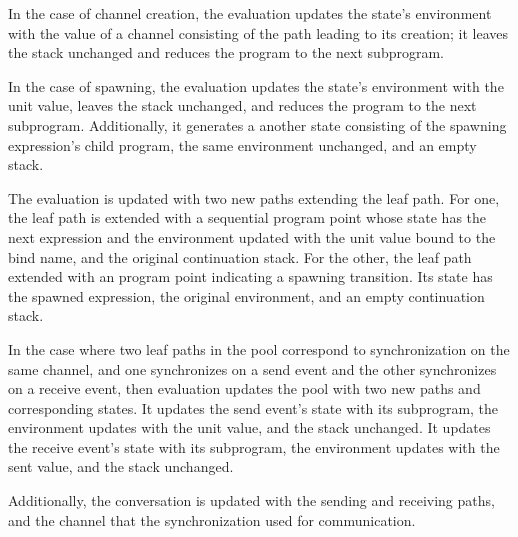 \documentclass[10pt]{article}
\begin{document}
In the case of channel creation, the evaluation updates the state's environment with the
value of a channel consisting of the path leading to its creation; it leaves the stack
unchanged and reduces the program to the next subprogram.

In the case of spawning, the evaluation updates the state's environment with the
unit value, leaves the stack unchanged, and reduces the program to the next subprogram.
Additionally, it generates a another state consisting of the spawning expression's child
program, the same environment unchanged, and an empty stack.

The evaluation is updated with two
new paths extending the leaf path.  For one, the leaf path is extended with a sequential
program point whose state has the next expression and the environment updated
with the unit value bound to
the bind name, and the original continuation stack. For the other, the leaf path
extended with an program point indicating a spawning transition.  Its state has the spawned
expression, the original environment, and an empty continuation stack. 

In the case where two leaf paths in the pool correspond to synchronization on the same channel,
and one synchronizes on a send event and the other synchronizes on a receive event, then
evaluation updates the pool with two new paths and corresponding states.
It updates the send event's state with its subprogram, the environment updates with the unit
value, and the stack unchanged.  It updates the receive event's state with its subprogram, the
environment updates with the sent value, and the stack unchanged.

Additionally, the conversation is updated with the sending and receiving paths, and the channel
that the synchronization used for communication. 
\end{document}
